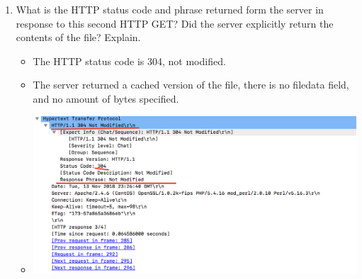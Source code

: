 \documentclass{article}
\begin{document}
\begin{itemize}
\begin{enumerate}
\begin{itemize}
        \end{itemize}
      \item What is the HTTP status code and phrase returned form the server in response to this second HTTP GET? Did the server explicitly return the contents of the file? Explain.
        \begin{itemize}
          \item The HTTP status code is 304, not modified.
          \item The server returned a cached version of the file, there is no filedata field, and no amount of bytes specified.
          \item \includegraphics[scale=0.5]{images/HTTP11.png}
        \end{itemize}
    \end{enumerate}
  \end{itemize}
\end{document}
